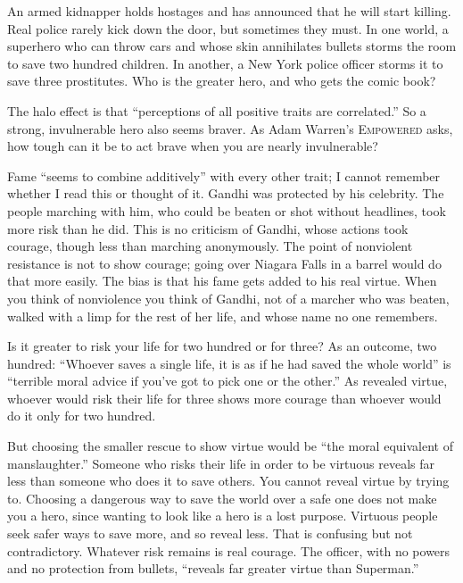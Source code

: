 
An armed kidnapper holds hostages and has announced that he will start killing. Real police rarely kick down the door, but sometimes they must. In one world, a superhero who can throw cars and whose skin annihilates bullets storms the room to save two hundred children. In another, a New York police officer storms it to save three prostitutes. Who is the greater hero, and who gets the comic book?

The halo effect is that ``perceptions of all positive traits are correlated.''  So a strong, invulnerable hero also seems braver.  As Adam Warren's \textsc{Empowered} asks, how tough can it be to act brave when you are nearly invulnerable?

Fame ``seems to combine additively'' with every other trait; I cannot remember whether I read this or thought of it. Gandhi was protected by his celebrity. The people marching with him, who could be beaten or shot without headlines, took more risk than he did.  This is no criticism of Gandhi, whose actions took courage, though less than marching anonymously. The point of nonviolent resistance is not to show courage; going over Niagara Falls in a barrel would do that more easily. The bias is that his fame gets added to his real virtue. When you think of nonviolence you think of Gandhi, not of a marcher who was beaten, walked with a limp for the rest of her life, and whose name no one remembers.

Is it greater to risk your life for two hundred or for three? As an outcome, two hundred: ``Whoever saves a single life, it is as if he had saved the whole world'' is ``terrible moral advice if you've got to pick one or the other.''  As revealed virtue, whoever would risk their life for three shows more courage than whoever would do it only for two hundred.

But choosing the smaller rescue to show virtue would be ``the moral equivalent of manslaughter.'' Someone who risks their life in order to be virtuous reveals far less than someone who does it to save others. You cannot reveal virtue by trying to. Choosing a dangerous way to save the world over a safe one does not make you a hero, since wanting to look like a hero is a lost purpose. Virtuous people seek safer ways to save more, and so reveal less. That is confusing but not contradictory. Whatever risk remains is real courage. The officer, with no powers and no protection from bullets, ``reveals far greater virtue than Superman.''
